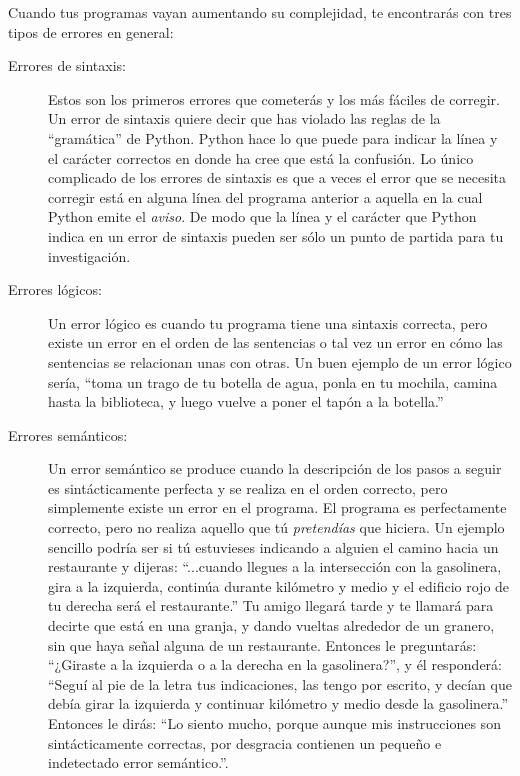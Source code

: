 Cuando tus programas vayan aumentando su complejidad, te encontrarás con
tres tipos de errores en general:

\begin{description}

\item[Errores de sintaxis:] Estos son los primeros errores que cometerás y los más
fáciles de corregir. Un error de sintaxis quiere decir que has violado las reglas de la
``gramática'' de Python. Python hace lo que puede para indicar la línea y el carácter
correctos en donde ha cree que está la confusión. Lo único complicado de los errores de
sintaxis es que a veces el error que se necesita corregir está en alguna línea del
programa anterior a aquella en la cual Python emite el {\em aviso}. De modo que la línea
y el carácter que Python indica en un error de sintaxis pueden ser sólo un punto de
partida para tu investigación.  

\item[Errores lógicos:] Un error lógico es cuando tu programa tiene una sintaxis correcta,
pero existe un error en el orden de las sentencias o tal vez un error en cómo las
sentencias se relacionan unas con otras.
Un buen ejemplo de un error lógico sería, ``toma un trago de tu botella de agua, ponla
en tu mochila, camina hasta la biblioteca, y luego vuelve a poner el tapón a la botella.'' 

\item[Errores semánticos:] Un error semántico se produce cuando la descripción de los
pasos a seguir es sintácticamente perfecta y se realiza en el orden correcto, pero
simplemente existe un error en el programa. El programa es perfectamente correcto, pero
no realiza aquello que tú {\em pretendías} que hiciera. Un ejemplo sencillo podría ser
si tú estuvieses indicando a alguien el camino hacia un restaurante y dijeras:
``...cuando llegues a la intersección con la gasolinera, gira a la izquierda, continúa
durante kilómetro y medio y el edificio rojo de tu derecha será el restaurante.'' Tu amigo
llegará tarde y te llamará para decirte que está en una granja, y dando vueltas alrededor
de un granero, sin que haya señal alguna de un restaurante.
Entonces le preguntarás: ``¿Giraste a la izquierda o a la derecha en la gasolinera?'', y él
responderá: ``Seguí al pie de la letra tus indicaciones, las tengo por escrito, y decían
que debía girar la izquierda y continuar kilómetro y medio desde la gasolinera.'' Entonces
le dirás: ``Lo siento mucho, porque aunque mis instrucciones son sintácticamente
correctas, por desgracia contienen un pequeño e indetectado error semántico.''.

\end{description}

